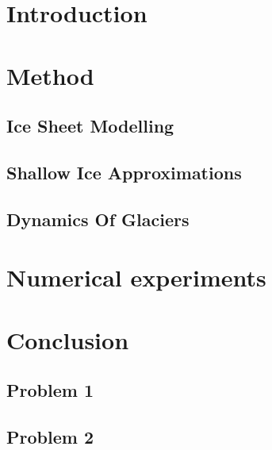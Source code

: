 \documentclass[11pt,a4paper,twoside,norsk]{article}
\begin{document}
\maketitle

\begin{abstract}
    
\end{abstract}
%
\section{Introduction}%
\label{sec:introduction}

%
\section{Method}
\subsection{Ice Sheet Modelling}

%
\subsection{Shallow Ice Approximations}

%
\subsection{Dynamics Of Glaciers}

%
%
%
%
%
\section{Numerical experiments}

%
\section{Conclusion}


\iffalse
\newpage
\subsection*{Problem 1}


\subsection*{Problem 2}

\end{document}

